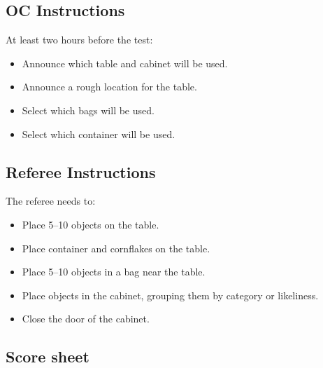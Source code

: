 \subsection*{OC Instructions}

At least two hours before the test:
\begin{itemize}
	\item Announce which table and cabinet will be used.
	\item Announce a rough location for the table.
	\item Select which bags will be used.
	\item Select which container will be used.
\end{itemize}

\subsection*{Referee Instructions}

The referee needs to:
\begin{itemize}
	\item Place 5--10 objects on the table.
	\item Place container and cornflakes on the table.
	\item Place 5--10 objects in a bag near the table.
	\item Place objects in the cabinet, grouping them by category or likeliness.
	\item Close the door of the cabinet.
\end{itemize}


\subsection*{Score sheet}



